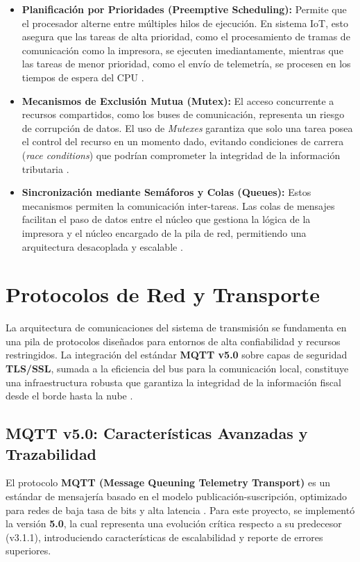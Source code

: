 \begin{itemize}
    \item \textbf{Planificación por Prioridades (Preemptive Scheduling):} Permite que el procesador alterne entre múltiples hilos de ejecución. En sistema IoT, esto asegura que las tareas de alta prioridad, como el procesamiento de tramas de comunicación como la impresora, se ejecuten imediantamente, mientras que las tareas de menor prioridad, como el envío de telemetría, se procesen en los tiempos de espera del CPU \cite{FreeRTOS_Kernel_Ref}.
    \item \textbf{Mecanismos de Exclusión Mutua (Mutex):} El acceso concurrente a recursos compartidos, como los buses de comunicación, representa un riesgo de corrupción de datos. El uso de \textit{Mutexes} garantiza que solo una tarea posea el control del recurso en un momento dado, evitando condiciones de carrera (\textit{race conditions}) que podrían comprometer la integridad de la información tributaria \cite{FreeRTOS_Kernel_Ref}.
    \item \textbf{Sincronización mediante Semáforos y Colas (Queues):} Estos mecanismos permiten la comunicación inter-tareas. Las colas de mensajes facilitan el paso de datos entre el núcleo que gestiona la lógica de la impresora y el núcleo encargado de la pila de red, permitiendo una arquitectura desacoplada y escalable \cite{FreeRTOS_Kernel_Ref}.
\end{itemize}

\section{Protocolos de Red y Transporte}

\par La arquitectura de comunicaciones del sistema de transmisión se fundamenta en una pila de protocolos diseñados para entornos de alta confiabilidad y recursos restringidos. La integración del estándar \textbf{MQTT v5.0} sobre capas de seguridad \textbf{TLS/SSL}, sumada a la eficiencia del bus para la comunicación local, constituye una infraestructura robusta que garantiza la integridad de la información fiscal desde el borde hasta la nube \cite{OASIS_MQTT_v5, RFC5246_TLS12}.

\subsection{MQTT v5.0: Características Avanzadas y Trazabilidad}

\par El protocolo \textbf{MQTT (Message Queuning Telemetry Transport)} es un estándar de mensajería basado en el modelo publicación-suscripción, optimizado para redes de baja tasa de bits y alta latencia \cite{OASIS_MQTT_v5}. Para este proyecto, se implementó la versión \textbf{5.0}, la cual representa una evolución crítica respecto a su predecesor (v3.1.1), introduciendo características de escalabilidad y reporte de errores superiores.\\

